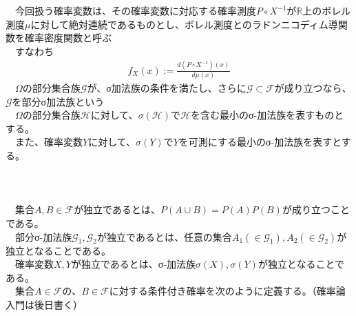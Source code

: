 \documentclass{jsarticle}
\begin{document}
　今回扱う確率変数は、その確率変数に対応する確率測度$P\circ X^{-1}$が$\mathbb{R}$上のボレル測度$\mu$に対して絶対連続であるものとし、ボレル測度とのラドンニコディム導関数を確率密度関数と呼ぶ\\
　すなわち
\begin{eqnarray}
f_X(x):=\frac{d(P\circ X^{-1})(x)}{d\mu(x)}
\end{eqnarray}
　$\Omega$の部分集合族$\mathcal{G}$が、σ加法族の条件を満たし、さらに$\mathcal{G}\subset\mathcal{F}$が成り立つなら、$\mathcal{G}$を部分σ加法族という\\
　$\Omega$の部分集合族$\mathcal{H}$に対して、$\sigma(\mathcal{H})$で$\mathcal{H}$を含む最小のσ-加法族を表すものとする。\\
　また、確率変数$Y$に対して、$\sigma(Y)$で$Y$を可測にする最小のσ-加法族を表すとする。\\
　\\
　\\
\scalebox{1.1}{2.独立性と条件付き期待値}\\
　集合$A,B\in\mathcal{F}$が独立であるとは、$P(A\cup B)=P(A)P(B)$が成り立つことである。\\
　部分σ-加法族$\mathcal{G}_1,\mathcal{G}_2$が独立であるとは、任意の集合$A_1(\in\mathcal{G}_1),A_2(\in\mathcal{G}_2)$が独立となることである。\\
　確率変数$X,Y$が独立であるとは、σ-加法族$\sigma(X),\sigma(Y)$が独立となることである。\\
　集合$A\in\mathcal{F}$の、$B\in\mathcal{F}$に対する条件付き確率を次のように定義する。（確率論入門は後日書く）
\newpage
\end{document}
